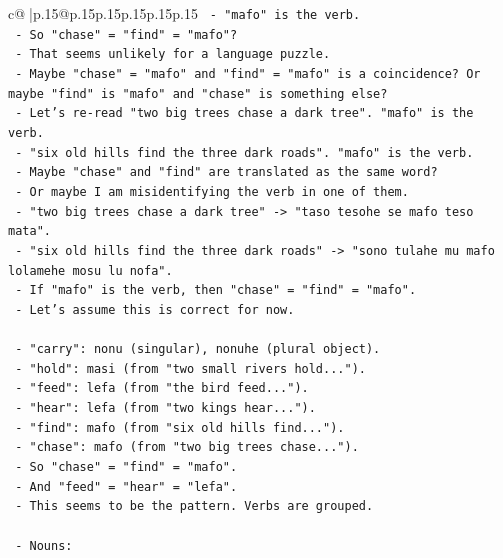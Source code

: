 \documentclass{article}
\begin{document}
{\begin{supertabular}{c@{$\;$}|p{.15\linewidth}@{}p{.15\linewidth}p{.15\linewidth}p{.15\linewidth}p{.15\linewidth}p{.15\linewidth}}
{{{\texttt{          {-} "mafo" is the verb.} \\
\texttt{          {-} So "chase" = "find" = "mafo"?} \\
\texttt{          {-} That seems unlikely for a language puzzle.} \\
\texttt{          {-} Maybe "chase" = "mafo" and "find" = "mafo" is a coincidence? Or maybe "find" is "mafo" and "chase" is something else?} \\
\texttt{          {-} Let's re{-}read "two big trees chase a dark tree". "mafo" is the verb.} \\
\texttt{          {-} "six old hills find the three dark roads". "mafo" is the verb.} \\
\texttt{          {-} Maybe "chase" and "find" are translated as the same word?} \\
\texttt{          {-} Or maybe I am misidentifying the verb in one of them.} \\
\texttt{          {-} "two big trees chase a dark tree" {-}> "taso tesohe se mafo teso mata".} \\
\texttt{          {-} "six old hills find the three dark roads" {-}> "sono tulahe mu mafo lolamehe mosu lu nofa".} \\
\texttt{          {-} If "mafo" is the verb, then "chase" = "find" = "mafo".} \\
\texttt{          {-} Let's assume this is correct for now.} \\
\\ 
\texttt{        {-} "carry": nonu (singular), nonuhe (plural object).} \\
\texttt{        {-} "hold": masi (from "two small rivers hold...").} \\
\texttt{        {-} "feed": lefa (from "the bird feed...").} \\
\texttt{        {-} "hear": lefa (from "two kings hear...").} \\
\texttt{        {-} "find": mafo (from "six old hills find...").} \\
\texttt{        {-} "chase": mafo (from "two big trees chase...").} \\
\texttt{        {-} So "chase" = "find" = "mafo".} \\
\texttt{        {-} And "feed" = "hear" = "lefa".} \\
\texttt{        {-} This seems to be the pattern. Verbs are grouped.} \\
\\ 
\texttt{        {-} Nouns:} \\
}}}
\end{supertabular}}
\end{document}
